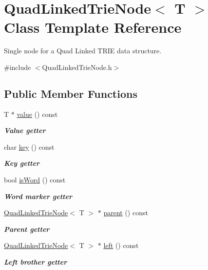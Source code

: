 \hypertarget{classQuadLinkedTrieNode}{\section{Quad\-Linked\-Trie\-Node$<$ T $>$ Class Template Reference}
\label{classQuadLinkedTrieNode}
}


Single node for a Quad Linked T\-R\-I\-E data structure.  




{\ttfamily \#include $<$Quad\-Linked\-Trie\-Node.\-h$>$}

\subsection*{Public Member Functions}
\begin{DoxyCompactItemize}
\item 
T $\ast$ \hyperlink{classQuadLinkedTrieNode_acac1fe6f910a2c9ac1ec59b3dab0d234}{value} () const 
\begin{DoxyCompactList}\small\item\em {\bfseries Value getter} \end{DoxyCompactList}\item 
char \hyperlink{classQuadLinkedTrieNode_adc500de1e3a3e5b49ff3027c17050407}{key} () const 
\begin{DoxyCompactList}\small\item\em {\bfseries Key getter} \end{DoxyCompactList}\item 
bool \hyperlink{classQuadLinkedTrieNode_aa1aa3e879d3c1a911c14b91498ae11f4}{is\-Word} () const 
\begin{DoxyCompactList}\small\item\em {\bfseries Word marker getter} \end{DoxyCompactList}\item 
\hyperlink{classQuadLinkedTrieNode}{Quad\-Linked\-Trie\-Node}$<$ T $>$ $\ast$ \hyperlink{classQuadLinkedTrieNode_a18683b74f840c6bb3b755acd58e5e9b3}{parent} () const 
\begin{DoxyCompactList}\small\item\em {\bfseries Parent getter} \end{DoxyCompactList}\item 
\hyperlink{classQuadLinkedTrieNode}{Quad\-Linked\-Trie\-Node}$<$ T $>$ $\ast$ \hyperlink{classQuadLinkedTrieNode_a630a8c0f64aa8684453bd06d579f3365}{left} () const 
\begin{DoxyCompactList}\small\item\em {\bfseries Left brother getter} \end{DoxyCompactList}\item 

\end{DoxyCompactItemize}
